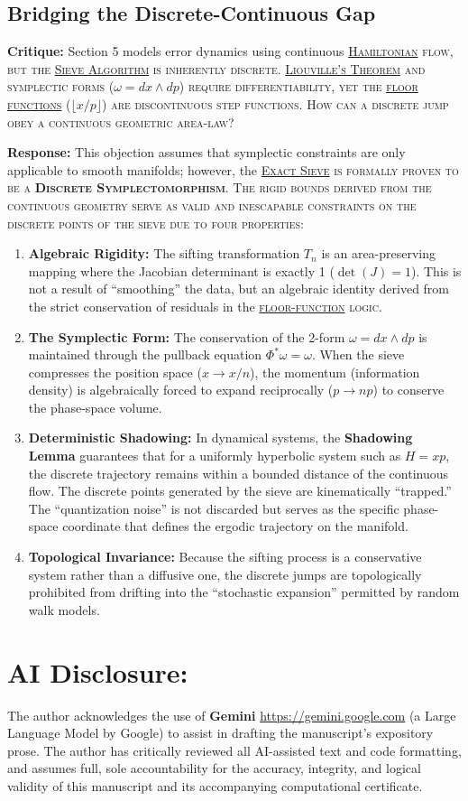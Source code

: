 \documentclass[sn-mathphys-num, pdflatex]{sn-jnl}
\newcommand{\gterm}[2]{\begingroup\normalfont\scshape\hyperlink{#1}{#2}\endgroup}
\begin{document}
\subsection*{Bridging the Discrete-Continuous Gap}
\textbf{Critique:} Section 5 models error dynamics using continuous \gterm{hamiltonian}{Hamiltonian} flow, but the \gterm{exact_sieve}{Sieve Algorithm} is inherently discrete. \gterm{liouville}{Liouville's Theorem} and symplectic forms ($\omega=dx \wedge dp$) require differentiability, yet the \gterm{floor_function}{floor functions} ($\lfloor x/p \rfloor$) are discontinuous step functions. How can a discrete jump obey a continuous geometric area-law?

\textbf{Response:} This objection assumes that symplectic constraints are only applicable to smooth manifolds; however, the \gterm{exact_sieve}{Exact Sieve} is formally proven to be a \textbf{Discrete Symplectomorphism}. The rigid bounds derived from the continuous geometry serve as valid and inescapable constraints on the discrete points of the sieve due to four properties:

\begin{enumerate}
    \item \textbf{Algebraic Rigidity:} The sifting transformation $T_n$ is an area-preserving mapping where the Jacobian determinant is exactly 1 ($\det(J)=1$). This is not a result of ``smoothing'' the data, but an algebraic identity derived from the strict conservation of residuals in the \gterm{floor_function}{floor-function} logic.
    \item \textbf{The Symplectic Form:} The conservation of the 2-form $\omega=dx \wedge dp$ is maintained through the pullback equation $\Phi^*\omega=\omega$. When the sieve compresses the position space ($x \to x/n$), the momentum (information density) is algebraically forced to expand reciprocally ($p \to np$) to conserve the phase-space volume.
    \item \textbf{Deterministic Shadowing:} In dynamical systems, the \textbf{Shadowing Lemma} guarantees that for a uniformly hyperbolic system such as $H=xp$, the discrete trajectory remains within a bounded distance of the continuous flow. The discrete points generated by the sieve are kinematically ``trapped.'' The ``quantization noise'' is not discarded but serves as the specific phase-space coordinate that defines the ergodic trajectory on the manifold.
    \item \textbf{Topological Invariance:} Because the sifting process is a conservative system rather than a diffusive one, the discrete jumps are topologically prohibited from drifting into the ``stochastic expansion'' permitted by random walk models.
\end{enumerate}
\section{AI Disclosure:} The author acknowledges the use of \textbf{Gemini} \url{https://gemini.google.com} (a Large Language Model by Google) to assist in drafting the manuscript's expository prose. The author has critically reviewed all AI-assisted text and code formatting, and assumes full, sole accountability for the accuracy, integrity, and logical validity of this manuscript and its accompanying computational certificate.
\end{document}
